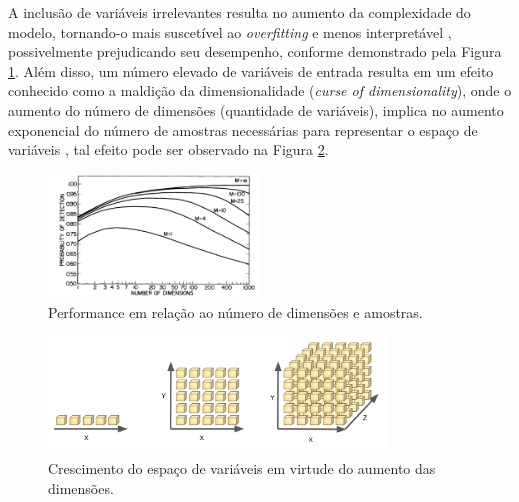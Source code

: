 A inclusão de variáveis irrelevantes resulta no aumento da complexidade do modelo, tornando-o mais suscetível ao \textit{overfitting} e menos interpretável \cite[p. 204]{intro_stat_learn}, possivelmente prejudicando seu desempenho, conforme demonstrado pela Figura \ref{fig:dim_perf}. Além disso, um número elevado de variáveis de entrada resulta em um efeito conhecido como a maldição da dimensionalidade (\textit{curse of dimensionality}), onde o aumento do número de dimensões (quantidade de variáveis), implica no aumento exponencial do número de amostras necessárias para representar o espaço de variáveis \cite[p. 34]{bishop_2006}, tal efeito pode ser observado na Figura \ref{fig:dim_grown}.

\begin{figure}[!htb]
    \caption{Performance em relação ao número de dimensões e amostras.}
    \begin{center}  
    \includegraphics[width=0.5\textwidth]{imgs/rev/dim_performance}
    \end{center}
    \label{fig:dim_perf}
\end{figure}


\begin{figure}[!htb]
    \caption{Crescimento do espaço de variáveis em virtude do aumento das dimensões.}
    \begin{center}    
    \includegraphics[width=0.8\textwidth]{imgs/rev/dimensionalty_grown.png}
    \end{center}
    \label{fig:dim_grown}
\end{figure}


